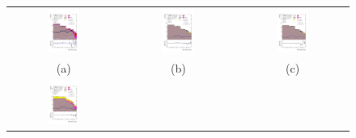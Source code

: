\begin{figure}[H]
\begin{tabular}{@{}ccc@{}}
\includegraphics[width=0.3\textwidth]{figures/tcH_reg1l2tau1bnj_os.pdf}&
\includegraphics[width=0.3\textwidth]{figures/tcH_reg1l1tau1b1j_ss.pdf}&
\includegraphics[width=0.3\textwidth]{figures/tcH_reg1l1tau1b2j_ss.pdf}\\
(a)  & (b) & (c) \\
\includegraphics[width=0.3\textwidth]{figures/tcH_reg1l1tau1b2j_os.pdf}&

\end{tabular}
\end{figure}
